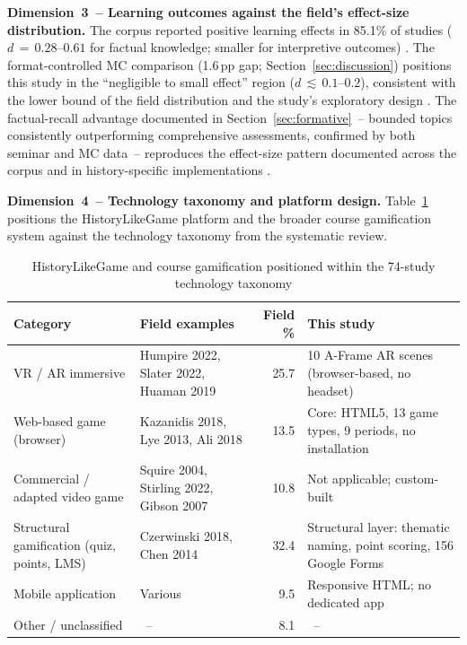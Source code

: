 \textbf{Dimension~3~-- Learning outcomes against the field's effect-size distribution.}
The corpus reported positive learning effects in 85.1\% of studies ($d\,{=}\,0.28$--$0.61$
for factual knowledge; smaller for interpretive outcomes) \cite{Clark2016, Connolly2012,
KorniienkoSemerikov2024}. The format-controlled MC comparison (1.6\,pp gap;
Section~\ref{sec:discussion}) positions this study in the ``negligible to small effect''
region ($d\,{\lesssim}\,0.1$--$0.2$), consistent with the lower bound of the field
distribution and the study's exploratory design \cite{KorniienkoSemerikov2024, Korniienko2025mrqs}.
The factual-recall advantage documented in Section~\ref{sec:formative}~-- bounded topics
consistently outperforming comprehensive assessments, confirmed by both seminar and MC
data~-- reproduces the effect-size pattern documented across the corpus \cite{Clark2016,
Connolly2012} and in history-specific implementations \cite{53Perez2014, 54Gibson2007,
59Kee2014270}.

\textbf{Dimension~4~-- Technology taxonomy and platform design.}
Table~\ref{tab:field-comparison} positions the HistoryLikeGame platform and the broader
course gamification system against the technology taxonomy from the systematic review.

\begin{table}[!h]
\centering
\caption{HistoryLikeGame and course gamification positioned within the 74-study technology taxonomy}
\label{tab:field-comparison}
\footnotesize
\begin{tabular}{lp{3.8cm}rp{5cm}}
\hline
\textbf{Category} & \textbf{Field examples} & \textbf{Field \%} & \textbf{This study} \\
\hline
VR / AR immersive & Humpire 2022, Slater 2022, Huaman 2019 \cite{13Humpire2022, 15Slater2022, 10Huaman2019220} & 25.7 & 10 A-Frame AR scenes (browser-based, no headset) \\
\hline
Web-based game (browser) & Kazanidis 2018, Lye 2013, Ali 2018 \cite{5kazanidis2018alpha, 50Lye2013, 43ali2021indonesian} & 13.5 & Core: HTML5, 13 game types, 9 periods, no installation \\
\hline
Commercial / adapted video game & Squire 2004, Stirling 2022, Gibson 2007 \cite{55Squire2004, 46Stirling2022, 54Gibson2007} & 10.8 & Not applicable; custom-built \\
\hline
Structural gamification (quiz, points, LMS) & Czerwinski 2018, Chen 2014 \cite{6Czerwinski2018, 16Chen201447} & 32.4 & Structural layer: thematic naming, point scoring, 156 Google Forms \\
\hline
Mobile application & Various & 9.5 & Responsive HTML; no dedicated app \\
\hline
Other / unclassified &~-- & 8.1 &~-- \\
\hline
\end{tabular}
\end{table}

